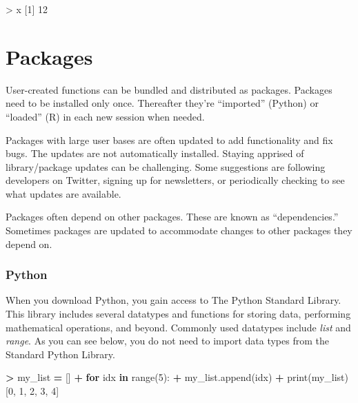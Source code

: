 \documentclass[
]{book}
\newenvironment{Shaded}{\begin{snugshade}}{\end{snugshade}}
\newcommand{\BuiltInTok}[1]{#1}
\newcommand{\ControlFlowTok}[1]{\textcolor[rgb]{0.13,0.29,0.53}{\textbf{#1}}}
\newcommand{\DecValTok}[1]{\textcolor[rgb]{0.00,0.00,0.81}{#1}}
\newcommand{\KeywordTok}[1]{\textcolor[rgb]{0.13,0.29,0.53}{\textbf{#1}}}
\newcommand{\NormalTok}[1]{#1}
\newcommand{\OperatorTok}[1]{\textcolor[rgb]{0.81,0.36,0.00}{\textbf{#1}}}
\newcommand{\SpecialCharTok}[1]{\textcolor[rgb]{0.00,0.00,0.00}{#1}}
\begin{document}
\begin{Shaded}
\begin{Highlighting}[]
\SpecialCharTok{\textgreater{}}\NormalTok{ x}
\NormalTok{[}\DecValTok{1}\NormalTok{] }\DecValTok{12}
\end{Highlighting}
\end{Shaded}

\hypertarget{packages}{%
\section{Packages}\label{packages}}

User-created functions can be bundled and distributed as packages. Packages need to be installed only once. Thereafter they're ``imported'' (Python) or ``loaded'' (R) in each new session when needed.

Packages with large user bases are often updated to add functionality and fix bugs. The updates are not automatically installed. Staying apprised of library/package updates can be challenging. Some suggestions are following developers on Twitter, signing up for newsletters, or periodically checking to see what updates are available.

Packages often depend on other packages. These are known as ``dependencies.'' Sometimes packages are updated to accommodate changes to other packages they depend on.

\hypertarget{python-3}{%
\subsubsection*{Python}\label{python-3}}

When you download Python, you gain access to The Python Standard Library. This library includes several datatypes and functions for storing data, performing mathematical operations, and beyond. Commonly used datatypes include \emph{list} and \emph{range}. As you can see below, you do not need to import data types from the Standard Python Library.

\begin{Shaded}
\begin{Highlighting}[]
\OperatorTok{\textgreater{}}\NormalTok{ my\_list }\OperatorTok{=}\NormalTok{ []}
\OperatorTok{+} \ControlFlowTok{for}\NormalTok{ idx }\KeywordTok{in} \BuiltInTok{range}\NormalTok{(}\DecValTok{5}\NormalTok{):}
\OperatorTok{+}\NormalTok{   my\_list.append(idx)}
\OperatorTok{+} \BuiltInTok{print}\NormalTok{(my\_list)}
\NormalTok{[}\DecValTok{0}\NormalTok{, }\DecValTok{1}\NormalTok{, }\DecValTok{2}\NormalTok{, }\DecValTok{3}\NormalTok{, }\DecValTok{4}\NormalTok{]}
\end{Highlighting}
\end{Shaded}
\end{document}
